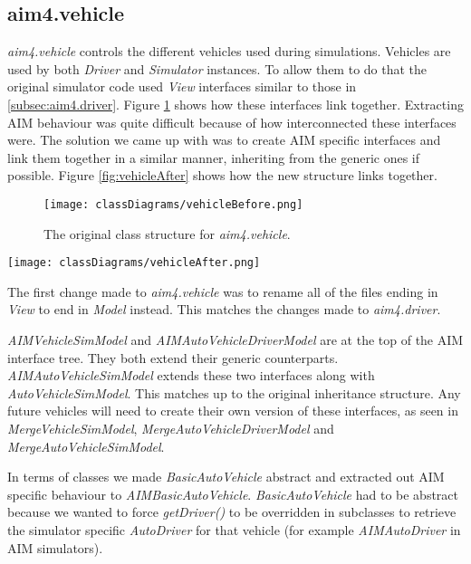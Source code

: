 \begin{appendices}
\subsection{aim4.vehicle}
\label{subsec:aim4.vehicle}
\emph{aim4.vehicle} controls the different vehicles used during simulations. Vehicles are used by both \emph{Driver} and \emph{Simulator} instances. To allow them to do that the original simulator code used \emph{View} interfaces similar to those in \ref{subsec:aim4.driver}. Figure \ref{fig:vehicleBefore} shows how these interfaces link together. Extracting AIM behaviour was quite difficult because of how interconnected these interfaces were. The solution we came up with was to create AIM specific interfaces and link them together in a similar manner, inheriting from the generic ones if possible. Figure \ref{fig:vehicleAfter} shows how the new structure links together.

\begin{figure}[htb]
\centering
\texttt{[image: classDiagrams/vehicleBefore.png]}
\caption{The original class structure for \emph{aim4.vehicle}.}
\label{fig:vehicleBefore}
\end{figure}

\begin{sidewaysfigure}[p]
\texttt{[image: classDiagrams/vehicleAfter.png]}
\caption{The new class structure for \emph{aim4.vehicle}.}
\label{fig:vehicleAfter}
\end{sidewaysfigure}

The first change made to \emph{aim4.vehicle} was to rename all of the files ending in \emph{View} to end in \emph{Model} instead. This matches the changes made to \emph{aim4.driver}.

\emph{AIMVehicleSimModel} and \emph{AIMAutoVehicleDriverModel} are at the top of the AIM interface tree. They both extend their generic counterparts. \emph{AIMAutoVehicleSimModel} extends these two interfaces along with \emph{AutoVehicleSimModel}. This matches up to the original inheritance structure. Any future vehicles will need to create their own version of these interfaces, as seen in \emph{MergeVehicleSimModel}, \emph{MergeAutoVehicleDriverModel} and \emph{MergeAutoVehicleSimModel}. 

In terms of classes we made \emph{BasicAutoVehicle} abstract and extracted out AIM specific behaviour to \emph{AIMBasicAutoVehicle}. \emph{BasicAutoVehicle} had to be abstract because we wanted to force \emph{getDriver()} to be overridden in subclasses to retrieve the simulator specific \emph{AutoDriver} for that vehicle (for example \emph{AIMAutoDriver} in AIM simulators). 


\end{appendices}

